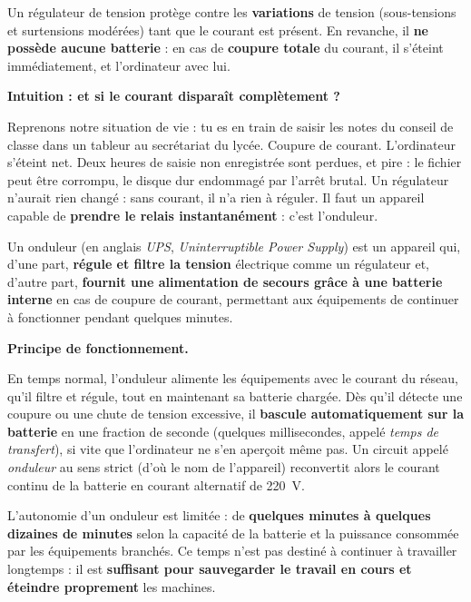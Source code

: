 \documentclass[11pt]{article}
\newcommand{\cle}[1]{{\popxbold\color{popdark}#1}}
\newcounter{popsec}
\newcounter{popsub}
\newcommand{\courssub}[1]{%
  \stepcounter{popsub}%
  \par\vspace{9pt}\noindent{\popxbold\fontsize{11.5}{13}\selectfont\color{popink}{\color{poporange}\thepopsec.\thepopsub}\hspace{6pt}#1}\par\nopagebreak\vspace{4pt}
}
\begin{document}
\begin{propriete}
Un régulateur de tension protège contre les \textbf{variations} de tension (sous-tensions et surtensions modérées) tant que le courant est présent. En revanche, il \textbf{ne possède aucune batterie} : en cas de \textbf{coupure totale} du courant, il s'éteint immédiatement, et l'ordinateur avec lui.
\end{propriete}

\courssub{L'onduleur (UPS)}

\textbf{Intuition : et si le courant disparaît complètement ?}\par

Reprenons notre situation de vie : tu es en train de saisir les notes du conseil de classe dans un tableur au secrétariat du lycée. Coupure de courant. L'ordinateur s'éteint net. Deux heures de saisie non enregistrée sont perdues, et pire : le fichier peut être corrompu, le disque dur endommagé par l'arrêt brutal. Un régulateur n'aurait rien changé : sans courant, il n'a rien à réguler. Il faut un appareil capable de \textbf{prendre le relais instantanément} : c'est l'onduleur.

\begin{definition}[Onduleur]
Un \cle{onduleur} (en anglais \emph{UPS}, \emph{Uninterruptible Power Supply}) est un appareil qui, d'une part, \textbf{régule et filtre la tension} électrique comme un régulateur et, d'autre part, \textbf{fournit une alimentation de secours grâce à une batterie interne} en cas de coupure de courant, permettant aux équipements de continuer à fonctionner pendant quelques minutes.
\end{definition}

\textbf{Principe de fonctionnement.}

En temps normal, l'onduleur alimente les équipements avec le courant du réseau, qu'il filtre et régule, tout en maintenant sa batterie chargée. Dès qu'il détecte une coupure ou une chute de tension excessive, il \textbf{bascule automatiquement sur la batterie} en une fraction de seconde (quelques millisecondes, appelé \emph{temps de transfert}), si vite que l'ordinateur ne s'en aperçoit même pas. Un circuit appelé \emph{onduleur} au sens strict (d'où le nom de l'appareil) reconvertit alors le courant continu de la batterie en courant alternatif de \SI{220}{V}.

\begin{propriete}
L'autonomie d'un onduleur est limitée : de \textbf{quelques minutes à quelques dizaines de minutes} selon la capacité de la batterie et la puissance consommée par les équipements branchés. Ce temps n'est pas destiné à continuer à travailler longtemps : il est \textbf{suffisant pour sauvegarder le travail en cours et éteindre proprement} les machines.
\end{propriete}
\end{document}

